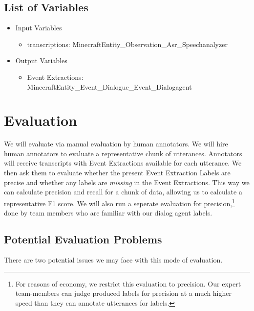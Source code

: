 \subsection{List of Variables}
\begin{itemize}
    \item Input Variables
    \begin{itemize}
        \item transcriptions: MinecraftEntity_Observation_Asr_Speechanalyzer
    \end{itemize}
    \item Output Variables
    \begin{itemize}
        \item Event Extractions: MinecraftEntity_Event_Dialogue_Event_Dialogagent
    \end{itemize}
\end{itemize}


\section{Evaluation}
We will evaluate via manual evaluation by human annotators. We will hire human annotators to evaluate a representative chunk of utterances. Annotators will receive transcripts with Event Extractions available for each utterance. We then ask them to evaluate whether the present Event Extraction Labels are precise and whether any labels are \emph{missing} in the Event Extractions. This way we can calculate precision and recall for a chunk of data, allowing us to calculate a representative F1 score.
We will also run a seperate evaluation for precision,\footnote{For reasons of economy, we restrict this evaluation to precision. Our expert team-members can judge produced labels for precision at a much higher speed than they can annotate utterances for labels.} done by team members who are familiar with our dialog agent labels.
\subsection{Potential Evaluation Problems}
There are two potential issues we may face with this mode of evaluation. 

